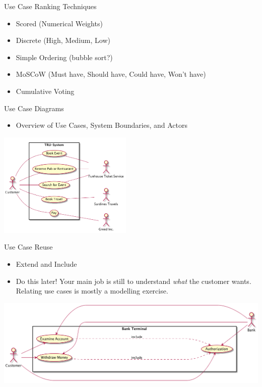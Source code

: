 \documentclass[10pt,t,a4paper]{beamer}
\begin{document}
\begin{frame}[label=sec-1-11]{Use Case Ranking Techniques}
\begin{itemize}
\item Scored (Numerical Weights)
\item Discrete (High, Medium, Low)
\item Simple Ordering (bubble sort?)
\item MoSCoW (Must have, Should have, Could have, Won't have)
\item Cumulative Voting
\end{itemize}
\end{frame}
\begin{frame}[label=sec-1-12]{Use Case Diagrams}
\begin{itemize}
\item Overview of Use Cases, System Boundaries, and Actors
\end{itemize}

\includegraphics[height=5cm]{FUCD.png}     
\end{frame}
\begin{frame}[label=sec-1-13]{Use Case Reuse}
\begin{itemize}
\item Extend and Include
\item \alert{Do this later!} Your main job is still to understand \emph{what} the customer wants. Relating use cases is mostly a modelling exercise.
\end{itemize}

\includegraphics[width=.9\linewidth]{FStructuringUC1.png}
\end{frame}
\end{document}
